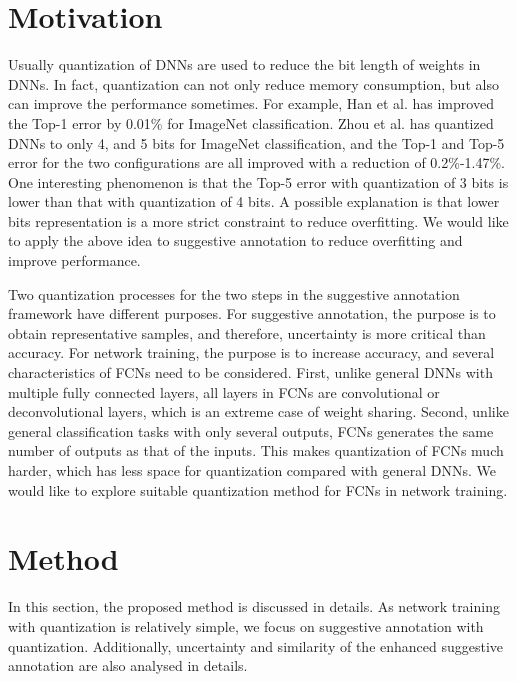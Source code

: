 \documentclass[10pt,twocolumn,letterpaper]{article}
\begin{document}
\section{Motivation}





Usually quantization of DNNs are used to reduce the bit length of weights in DNNs.
In fact, quantization can not only reduce memory consumption, but also can improve the performance sometimes.
For example, Han et al. \cite{han2015deep} has improved the Top-1 error by 0.01\% for ImageNet classification.
Zhou et al. \cite{zhou2017incremental} has quantized DNNs to only 4, and 5 bits for ImageNet classification, and the Top-1 and Top-5 error for the two configurations are all improved with a reduction of 0.2\%-1.47\%.
One interesting phenomenon is that the Top-5 error with quantization of 3 bits is lower than that with quantization of 4 bits.
A possible explanation is that lower bits representation is a more strict constraint to reduce overfitting.
We would like to apply the above idea to suggestive annotation \cite{yang2017suggestive} to reduce overfitting and improve performance.

Two quantization processes for the two steps in the suggestive annotation framework have different purposes.
For suggestive annotation, the purpose is to obtain representative samples, and therefore, uncertainty is more critical than accuracy.
For network training, the purpose is to increase accuracy, and several characteristics of FCNs need to be considered.
First, unlike general DNNs with multiple fully connected layers, all layers in FCNs are convolutional or deconvolutional layers, which is an extreme case of weight sharing.
Second, unlike general classification tasks with only several outputs, FCNs generates the same number of outputs as that of the inputs.
This makes quantization of FCNs much harder, which has less space for quantization compared with general DNNs.
We would like to explore suitable quantization method for FCNs in network training.








\section{Method}
In this section, the proposed method is discussed in details.
As network training with quantization is relatively simple, we focus on suggestive annotation with quantization.
Additionally, uncertainty and similarity of the enhanced suggestive annotation are also analysed in details.
\end{document}
